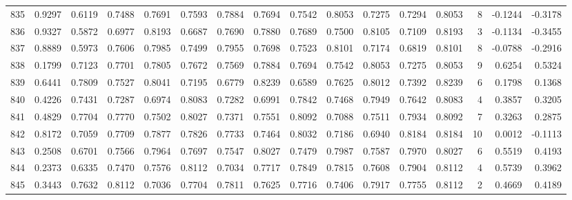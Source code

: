 \begin{tabular}{lrrrrrrrrrrrrrrr}
835 &      0.9297 &  0.6119 &  0.7488 &  0.7691 &  0.7593 &  0.7884 &  0.7694 &  0.7542 &  0.8053 &  0.7275 &   0.7294 &     0.8053 &      8 &                   -0.1244 &                    -0.3178 \\
836 &      0.9327 &  0.5872 &  0.6977 &  0.8193 &  0.6687 &  0.7690 &  0.7880 &  0.7689 &  0.7500 &  0.8105 &   0.7109 &     0.8193 &      3 &                   -0.1134 &                    -0.3455 \\
837 &      0.8889 &  0.5973 &  0.7606 &  0.7985 &  0.7499 &  0.7955 &  0.7698 &  0.7523 &  0.8101 &  0.7174 &   0.6819 &     0.8101 &      8 &                   -0.0788 &                    -0.2916 \\
838 &      0.1799 &  0.7123 &  0.7701 &  0.7805 &  0.7672 &  0.7569 &  0.7884 &  0.7694 &  0.7542 &  0.8053 &   0.7275 &     0.8053 &      9 &                    0.6254 &                     0.5324 \\
839 &      0.6441 &  0.7809 &  0.7527 &  0.8041 &  0.7195 &  0.6779 &  0.8239 &  0.6589 &  0.7625 &  0.8012 &   0.7392 &     0.8239 &      6 &                    0.1798 &                     0.1368 \\
840 &      0.4226 &  0.7431 &  0.7287 &  0.6974 &  0.8083 &  0.7282 &  0.6991 &  0.7842 &  0.7468 &  0.7949 &   0.7642 &     0.8083 &      4 &                    0.3857 &                     0.3205 \\
841 &      0.4829 &  0.7704 &  0.7770 &  0.7502 &  0.8027 &  0.7371 &  0.7551 &  0.8092 &  0.7088 &  0.7511 &   0.7934 &     0.8092 &      7 &                    0.3263 &                     0.2875 \\
842 &      0.8172 &  0.7059 &  0.7709 &  0.7877 &  0.7826 &  0.7733 &  0.7464 &  0.8032 &  0.7186 &  0.6940 &   0.8184 &     0.8184 &     10 &                    0.0012 &                    -0.1113 \\
843 &      0.2508 &  0.6701 &  0.7566 &  0.7964 &  0.7697 &  0.7547 &  0.8027 &  0.7479 &  0.7987 &  0.7587 &   0.7970 &     0.8027 &      6 &                    0.5519 &                     0.4193 \\
844 &      0.2373 &  0.6335 &  0.7470 &  0.7576 &  0.8112 &  0.7034 &  0.7717 &  0.7849 &  0.7815 &  0.7608 &   0.7904 &     0.8112 &      4 &                    0.5739 &                     0.3962 \\
845 &      0.3443 &  0.7632 &  0.8112 &  0.7036 &  0.7704 &  0.7811 &  0.7625 &  0.7716 &  0.7406 &  0.7917 &   0.7755 &     0.8112 &      2 &                    0.4669 &                     0.4189 \\

\end{tabular}
